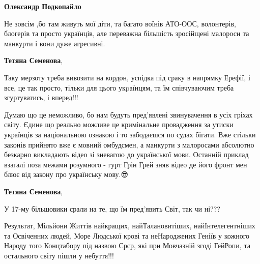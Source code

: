 \begin{itemize}
\begin{itemize}
 
\textbf{Олександр Подкопайло} 

Не зовсім ,бо там живуть мої діти, та багато
воїнів АТО-ООС, волонтерів, блогерів та просто українців, але переважна
більшість зросійщені малороси та манкурти і вони дуже агресивні.


 
\textbf{Тетяна Семенова}, 

Таку мерзоту треба вивозити на кордон, успідка під сраку в напрямку Ерефії, і
все, це так просто, тільки для цього укpаїнцям, та їм співчуваючим треба
згуртуватись, і вперед!!!

 

Думаю що це неможливо, бо нам будуть пред'явлені звинувачення в усіх гріхах
світу. Єдине що реально можливе це кримінальне провадження за утиски українців
за національною ознакою і то забодаєшся по судах бігати. Вже стільки законів
прийнято вже є мовний омбудсмен, а манкурти з малоросами абсолютно безкарно
викладають відео зі зневагою до української мови. Останній приклад взагалі поза
межами розумного - гурт Грін Грей зняв відео де його фронт мен блює від закону
про українську мову.😎

 
\textbf{Тетяна Семенова},

У 17-му більшовики срали на те, що їм пред'явить Світ, так чи ні???

Результат, Мільйони Життів найкращих, найТалановитіших, найІнтелегентніших та
Освіченних людей, Море Людської крові та неНароджених Геніїв у кожного Народу
того Концтабору під назвою Срср, які при Мовчазній згоді ГейРопи, та остального
світу пішли у небуття!!!


\end{itemize}
\end{itemize}
